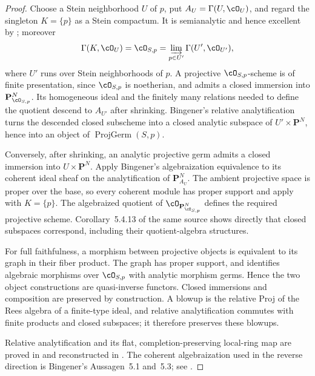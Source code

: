 \begin{proof}
Choose a Stein neighborhood $U$ of $p$, put
$A_U=\Gamma(U,\cO_U)$, and regard the singleton $K=\{p\}$ as a
Stein compactum.  It is semianalytic and hence excellent by
\cite[Corollary~4.4.5]{XiaStein26}; moreover
\[
              \Gamma(K,\cO_U)=\cO_{S,p}
              =\varinjlim_{p\in U'}\Gamma(U',\cO_{U'}),
\]
where $U'$ runs over Stein neighborhoods of $p$.  A projective
$\cO_{S,p}$-scheme is of finite presentation, since $\cO_{S,p}$ is
noetherian, and admits a closed immersion into
$\mathbf P^N_{\cO_{S,p}}$.  Its homogeneous ideal and the finitely many
relations needed to define the quotient descend to $A_{U'}$ after
shrinking.  Bingener's relative analytification
\cite[Theorem~5.3.1]{XiaStein26} turns the descended closed subscheme into
a closed analytic subspace of $U'\times\mathbf P^N$, hence into an object
of $\operatorname{ProjGerm}(S,p)$.

Conversely, after shrinking, an analytic projective germ admits a closed
immersion into $U\times\mathbf P^N$.  Apply Bingener's algebraization
equivalence to its coherent ideal sheaf on the analytification of
$\mathbf P^N_{A_U}$.  The ambient projective space is proper over the
base, so every coherent module has proper support and
\cite[Theorem~5.4.4 and Corollary~5.4.12]{XiaStein26} apply with
$K=\{p\}$.  The algebraized quotient of
$\cO_{\mathbf P^N_{\cO_{S,p}}}$ defines the required projective scheme.
Corollary~5.4.13 of the same source shows directly that closed subspaces
correspond, including their quotient-algebra structures.

For full faithfulness, a morphism between projective objects is equivalent
to its graph in their fiber product.  The graph has proper support, and
\cite[Corollary~5.4.14]{XiaStein26} identifies algebraic morphisms over
$\cO_{S,p}$ with analytic morphism germs.  Hence the two object
constructions are quasi-inverse functors.  Closed immersions and composition
are preserved by construction.  A blowup is the relative Proj of the Rees
algebra of a finite-type ideal, and relative analytification commutes with
finite products and closed subspaces; it therefore preserves these blowups.

Relative analytification and its flat, completion-preserving local-ring map
are proved in \cite[Section~1]{Bingener76Stein} and reconstructed in
\cite[Theorem~5.3.1]{XiaStein26}.  The coherent algebraization used in the
reverse direction is Bingener's Aussagen~5.1 and~5.3; see
\cite[Theorem~5.4.4 and Corollaries~5.4.12--5.4.14]{XiaStein26}.
\end{proof}

